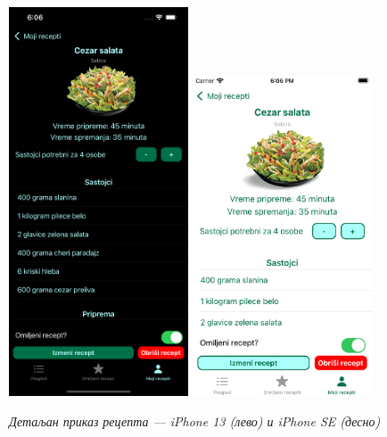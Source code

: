 \documentclass[12pt,oneside]{memoir}
\begin{document}
\begin{figure} [H]
    \centering
    \captionsetup{justification=centering}
    \includegraphics[width=0.475\textwidth]{images/simulators/view images/dark - detail4.png} 
    \hfill
    \includegraphics[width=0.475\textwidth]{images/simulators/view images/light - detail4.png} 
    \caption{\textit{Детаљан приказ рецепта --- iPhone 13 (лево) и iPhone SE (десно)}}
    \label{slika:детаљан_рецепт_1}
\end{figure}
\end{document}
